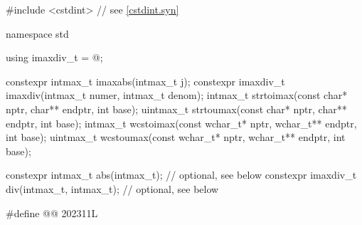 \begin{codeblock}
#include <cstdint>  // see \ref{cstdint.syn}

namespace std {
  using imaxdiv_t = @\seebelow@;

  constexpr intmax_t imaxabs(intmax_t j);
  constexpr imaxdiv_t imaxdiv(intmax_t numer, intmax_t denom);
  intmax_t strtoimax(const char* nptr, char** endptr, int base);
  uintmax_t strtoumax(const char* nptr, char** endptr, int base);
  intmax_t wcstoimax(const wchar_t* nptr, wchar_t** endptr, int base);
  uintmax_t wcstoumax(const wchar_t* nptr, wchar_t** endptr, int base);

  constexpr intmax_t abs(intmax_t);             // optional, see below
  constexpr imaxdiv_t div(intmax_t, intmax_t);  // optional, see below
}

#define @@ 202311L


\end{codeblock}
